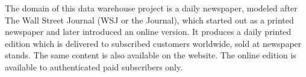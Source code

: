 
The domain of this data warehouse project is a daily newspaper, modeled after The Wall Street Journal (WSJ or the Journal), which started out as a printed newspaper and later introduced an online version. It produces a daily printed edition which is delivered to subscribed customers worldwide, sold at newspaper stands. The same content is also available on the website. The online edition is available to authenticated paid subscribers only.

